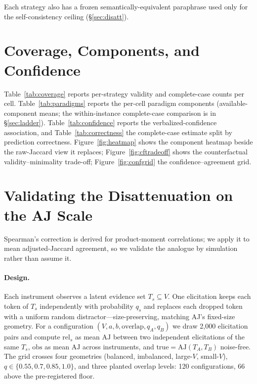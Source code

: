\documentclass[11pt]{article}
\newcommand{\aj}{\mathrm{AJ}}
\begin{document}
Each strategy also has a frozen semantically-equivalent paraphrase used only for the self-consistency ceiling (\S\ref{sec:disatt}).

\section{Coverage, Components, and Confidence}
\label{app:tables}

Table~\ref{tab:coverage} reports per-strategy validity and complete-case counts per cell. Table~\ref{tab:paradigms} reports the per-cell paradigm components (available-component means; the within-instance complete-case comparison is in \S\ref{sec:ladder}). Table~\ref{tab:confidence} reports the verbalized-confidence association, and Table~\ref{tab:correctness} the complete-case estimate split by prediction correctness. Figure~\ref{fig:heatmap} shows the component heatmap beside the raw-Jaccard view it replaces; Figure~\ref{fig:cftradeoff} shows the counterfactual validity--minimality trade-off; Figure~\ref{fig:confgrid} the confidence--agreement grid.






\section{Validating the Disattenuation on the AJ Scale}
\label{app:simulation}

Spearman's correction is derived for product-moment correlations; we apply it to mean adjusted-Jaccard agreement, so we validate the analogue by simulation rather than assume it.

\paragraph{Design.} Each instrument observes a latent evidence set $T_s \subseteq V$. One elicitation keeps each token of $T_s$ independently with probability $q_s$ and replaces each dropped token with a uniform random distractor---size-preserving, matching AJ's fixed-size geometry. For a configuration $(V,a,b,\text{overlap},q_A,q_B)$ we draw 2{,}000 elicitation pairs and compute $\mathrm{rel}_s$ as mean $\aj$ between two independent elicitations of the same $T_s$, $\mathrm{obs}$ as mean $\aj$ across instruments, and $\mathrm{true}=\aj(T_A,T_B)$ noise-free. The grid crosses four geometries (balanced, imbalanced, large-$V$, small-$V$), $q\in\{0.55,0.7,0.85,1.0\}$, and three planted overlap levels: 120 configurations, 66 above the pre-registered floor.
\end{document}
